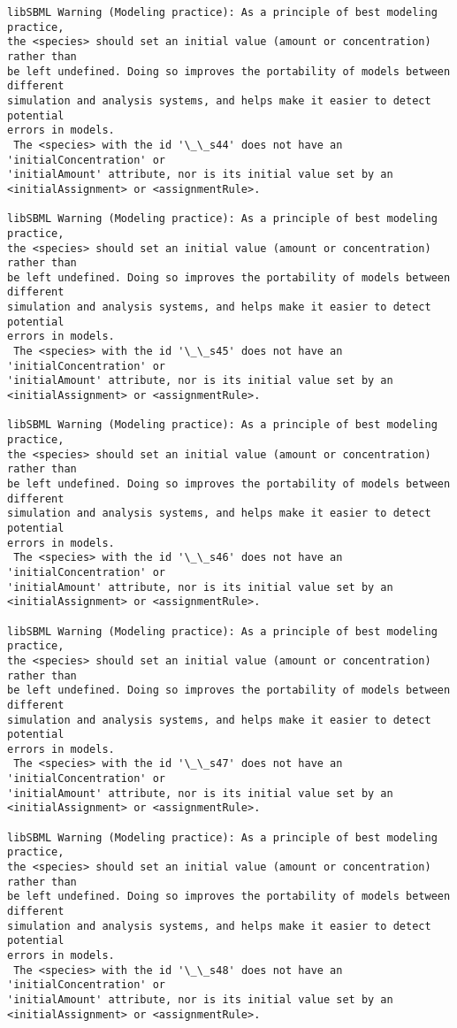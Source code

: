 \documentclass[11pt]{article}
\begin{document}
\begin{Verbatim}[commandchars=\\\{\}]
libSBML Warning (Modeling practice): As a principle of best modeling practice,
the <species> should set an initial value (amount or concentration) rather than
be left undefined. Doing so improves the portability of models between different
simulation and analysis systems, and helps make it easier to detect potential
errors in models.
 The <species> with the id '\_\_s44' does not have an 'initialConcentration' or
'initialAmount' attribute, nor is its initial value set by an
<initialAssignment> or <assignmentRule>.

libSBML Warning (Modeling practice): As a principle of best modeling practice,
the <species> should set an initial value (amount or concentration) rather than
be left undefined. Doing so improves the portability of models between different
simulation and analysis systems, and helps make it easier to detect potential
errors in models.
 The <species> with the id '\_\_s45' does not have an 'initialConcentration' or
'initialAmount' attribute, nor is its initial value set by an
<initialAssignment> or <assignmentRule>.

libSBML Warning (Modeling practice): As a principle of best modeling practice,
the <species> should set an initial value (amount or concentration) rather than
be left undefined. Doing so improves the portability of models between different
simulation and analysis systems, and helps make it easier to detect potential
errors in models.
 The <species> with the id '\_\_s46' does not have an 'initialConcentration' or
'initialAmount' attribute, nor is its initial value set by an
<initialAssignment> or <assignmentRule>.

libSBML Warning (Modeling practice): As a principle of best modeling practice,
the <species> should set an initial value (amount or concentration) rather than
be left undefined. Doing so improves the portability of models between different
simulation and analysis systems, and helps make it easier to detect potential
errors in models.
 The <species> with the id '\_\_s47' does not have an 'initialConcentration' or
'initialAmount' attribute, nor is its initial value set by an
<initialAssignment> or <assignmentRule>.

libSBML Warning (Modeling practice): As a principle of best modeling practice,
the <species> should set an initial value (amount or concentration) rather than
be left undefined. Doing so improves the portability of models between different
simulation and analysis systems, and helps make it easier to detect potential
errors in models.
 The <species> with the id '\_\_s48' does not have an 'initialConcentration' or
'initialAmount' attribute, nor is its initial value set by an
<initialAssignment> or <assignmentRule>.


\end{Verbatim}
\end{document}
